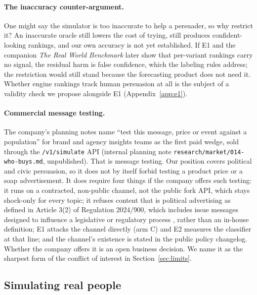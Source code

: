 \documentclass[11pt]{article}
\newcommand{\internal}[1]{internal planning note \nolinkurl{#1}, unpublished}
\begin{document}
\paragraph{The inaccuracy counter-argument.} One might say the simulator is too inaccurate to help a persuader, so why restrict it? An inaccurate oracle still lowers the cost of trying, still produces confident-looking rankings, and our own accuracy is not yet established. If E1 and the companion \emph{The Real World Benchmark} later show that per-variant rankings carry no signal, the residual harm is false confidence, which the labeling rules address; the restriction would still stand because the forecasting product does not need it. Whether engine rankings track human persuasion at all is the subject of a validity check we propose alongside E1 (Appendix~\ref{app:e1}).

\paragraph{Commercial message testing.} The company's planning notes name ``test this message, price or event against a population'' for brand and agency insights teams as the first paid wedge, sold through the \texttt{/v1/simulate} API (\internal{research/market/014-who-buys.md}). That is message testing. Our position covers political and civic persuasion, so it does not by itself forbid testing a product price or a soap advertisement. It does require four things if the company offers such testing: it runs on a contracted, non-public channel, not the public fork API, which stays shock-only for every topic; it refuses content that is political advertising as defined in Article 3(2) of Regulation 2024/900, which includes issue messages designed to influence a legislative or regulatory process \citep{eupoladv2024}, rather than an in-house definition; E1 attacks the channel directly (arm C) and E2 measures the classifier at that line; and the channel's existence is stated in the public policy changelog. Whether the company offers it is an open business decision. We name it as the sharpest form of the conflict of interest in Section~\ref{sec:limits}.

\subsection{Simulating real people}
\end{document}
